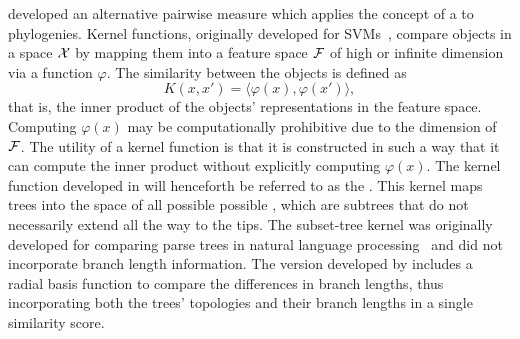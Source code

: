 \textcite{poon2013mapping} developed an alternative pairwise measure which
applies the concept of a  to phylogenies. Kernel
functions, originally developed for \glspl{SVM}~\autocite{burges1998tutorial}, 
compare objects in a space $\mathcal{X}$ by mapping them into a feature space $\mathcal{F}$ of
high or infinite dimension via a function $\varphi$. The similarity between the
objects is defined as
\[  
  K(x, x') = \langle \varphi(x), \varphi(x')\rangle,
\]
that is, the inner product of the objects' representations in the feature
space. Computing $\varphi(x)$ may be computationally prohibitive due to the
dimension of $\mathcal{F}$. The utility of a kernel function is that it is
constructed in such a way that it can compute the inner product without
explicitly computing $\varphi(x)$. The kernel function developed in
\autocite{poon2013mapping} will henceforth be referred to as the . This kernel maps trees into the space of all possible possible
, which are subtrees that do not necessarily extend all the
way to the tips. The subset-tree kernel was originally developed for comparing
parse trees in natural language processing~\autocite{collins2002new} and did
not incorporate branch length information. The version developed by
\textcite{poon2013mapping} includes a radial basis function to compare the
differences in branch lengths, thus incorporating both the trees' topologies
and their branch lengths in a single similarity score. 

